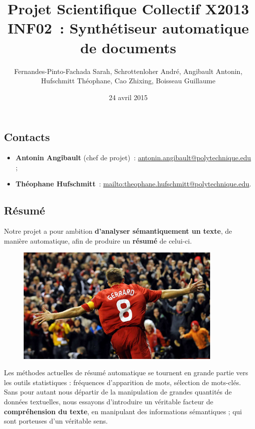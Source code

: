 \documentclass[a4paper,12pt]{article}
\title{Projet Scientifique Collectif X2013 \\INF02~: Synthétiseur automatique de documents}
\author{Fernandes-Pinto-Fachada Sarah, Schrottenloher Andr\'e, Angibault Antonin,\\
Hufschmitt Th\'eophane, Cao Zhixing, Boisseau Guillaume}
\date{24 avril 2015}
\begin{document}
\titrecourt %

\subsection*{Contacts}

\begin{itemize}
 \item \textbf{Antonin Angibault} (chef de projet)~: \href{mailto:antonin.angibault@polytechnique.edu}{antonin.angibault@polytechnique.edu} ;
 \item \textbf{Théophane Hufschmitt}~: \href{mailto:theophane.hufschmitt@polytechnique.edu}{mailto:theophane.hufschmitt@polytechnique.edu}.
\end{itemize}


\subsection*{Résumé}

Notre projet a pour ambition \textbf{d'analyser sémantiquement un texte}, de manière automatique, afin de produire un \textbf{résumé} de celui-ci. \\

\begin{figure}
  \centering
  \includegraphics[width = 10cm]{./gerrard.jpg}
\end{figure}

Les méthodes actuelles de résumé automatique se tournent en grande partie vers les outils statistiques : fréquences d'apparition de mots, sélection de mots-clés. Sans pour autant nous départir de la manipulation de grandes quantités de données textuelles, nous essayons d'introduire un véritable facteur de \textbf{compréhension du texte}, en manipulant des informations sémantiques ; qui sont porteuses d'un véritable sens. 
\end{document}
